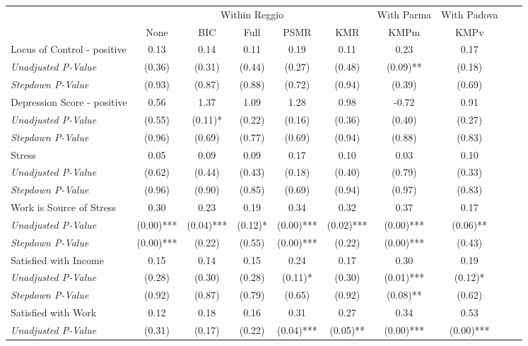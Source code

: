 \begin{tabular}{l c c c c c c c c c}
\toprule
& \multicolumn{5}{c}{Within Reggio} & With Parma & With Padova \\\cmidrule(lr){2-6} \cmidrule(lr){7} \cmidrule(lr){8}
 & None & BIC & Full & PSMR & KMR & KMPm & KMPv \\
\midrule
Locus of Control - positive & 0.13 & 0.14 & 0.11 & 0.19 & 0.11 & 0.23 & 0.17 \\
\quad \textit{Unadjusted P-Value} & (0.36) & (0.31) & (0.44) & (0.27) & (0.48) & (0.09)** & (0.18) \\
\quad \textit{Stepdown P-Value} & (0.93) & (0.87) & (0.88) & (0.72) & (0.94) & (0.39) & (0.69) \\
Depression Score - positive & 0.56 & 1.37 & 1.09 & 1.28 & 0.98 & -0.72 & 0.91 \\
\quad \textit{Unadjusted P-Value} & (0.55) & (0.11)* & (0.22) & (0.16) & (0.36) & (0.40) & (0.27) \\
\quad \textit{Stepdown P-Value} & (0.96) & (0.69) & (0.77) & (0.69) & (0.94) & (0.88) & (0.83) \\
Stress & 0.05 & 0.09 & 0.09 & 0.17 & 0.10 & 0.03 & 0.10 \\
\quad \textit{Unadjusted P-Value} & (0.62) & (0.44) & (0.43) & (0.18) & (0.40) & (0.79) & (0.33) \\
\quad \textit{Stepdown P-Value} & (0.96) & (0.90) & (0.85) & (0.69) & (0.94) & (0.97) & (0.83) \\
Work is Source of Stress & 0.30 & 0.23 & 0.19 & 0.34 & 0.32 & 0.37 & 0.17 \\
\quad \textit{Unadjusted P-Value} & (0.00)*** & (0.04)*** & (0.12)* & (0.00)*** & (0.02)*** & (0.00)*** & (0.06)** \\
\quad \textit{Stepdown P-Value} & (0.00)*** & (0.22) & (0.55) & (0.00)*** & (0.22) & (0.00)*** & (0.43) \\
Satisfied with Income & 0.15 & 0.14 & 0.15 & 0.24 & 0.17 & 0.30 & 0.19 \\
\quad \textit{Unadjusted P-Value} & (0.28) & (0.30) & (0.28) & (0.11)* & (0.30) & (0.01)*** & (0.12)* \\
\quad \textit{Stepdown P-Value} & (0.92) & (0.87) & (0.79) & (0.65) & (0.92) & (0.08)** & (0.62) \\
Satisfied with Work & 0.12 & 0.18 & 0.16 & 0.31 & 0.27 & 0.34 & 0.53 \\
\quad \textit{Unadjusted P-Value} & (0.31) & (0.17) & (0.22) & (0.04)*** & (0.05)** & (0.00)*** & (0.00)*** \\

\end{tabular}

